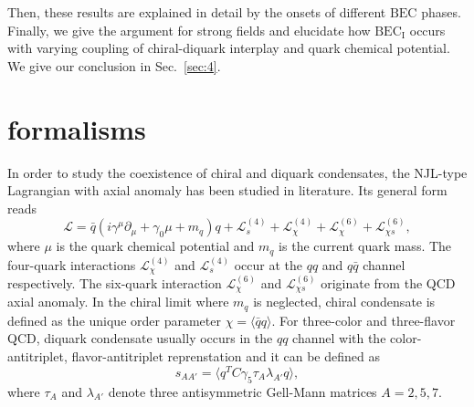 \documentclass[prd, showpacs,nofootinbib,amsmath,amssymb,12pt]{revtex4}
\begin{document}
Then, these results are explained in detail by the onsets of different $\text{BEC}$ phases. 
Finally, we give the argument for strong fields and elucidate how $\text{BEC}_\text{I}$ occurs with varying coupling of chiral-diquark interplay and quark chemical potential.
We give our conclusion in Sec.~\ref{sec:4}.

\section{formalisms}
\label{sec:2}
In order to study the coexistence of chiral and diquark condensates,
the NJL-type Lagrangian with axial anomaly has been studied in literature.
Its general form reads
\begin{equation}
	\mathcal{L} = \bar{q} (i\gamma^\mu \partial_\mu + \gamma_0\mu +m_q) q +
	\mathcal{L}^{(4)}_s+\mathcal{L}^{(4)}_\chi+ \mathcal{L}^{(6)}_\chi+\mathcal{L}^{(6)}_{\chi s},
	\label{eq:lag}
\end{equation}
where $\mu$ is the quark chemical potential and $m_q$ is the current quark mass.
The four-quark interactions $\mathcal{L}^{(4)}_\chi$ and $\mathcal{L}^{(4)}_s$ 
occur at the $qq$ and $q\bar{q}$ channel respectively.
The six-quark interaction $\mathcal{L}^{(6)}_{\chi}$ and $\mathcal{L}^{(6)}_{\chi s}$ originate from the QCD axial anomaly.
In the chiral limit where $m_q$ is neglected, chiral condensate is defined as the 
unique order parameter $\chi = \langle \bar{q} q \rangle$.
For three-color and three-flavor QCD,  diquark condensate usually occurs in the  $qq$ channel with  the color-antitriplet, flavor-antitriplet reprenstation and it can be defined as \cite{alford1998qcd,buballa2002color}
\begin{equation}
\label{s}
s_{AA'}=\langle q^TC\gamma_5\tau_A\lambda_{A'} q\rangle,
\end{equation}
where $\tau_A$ and $\lambda_{A'}$ denote three antisymmetric Gell-Mann matrices $A=2,5,7$.
\end{document}
